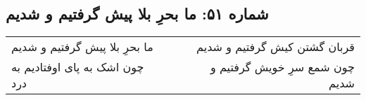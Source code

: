 \begin{center}
\section*{شماره ۵۱: ما بحرِ بلا پیش گرفتیم و شدیم}
\label{sec:051}
\begin{longtable}{l p{0.5cm} r}
ما بحرِ بلا پیش گرفتیم و شدیم
&&
قربان گشتن کیش گرفتیم و شدیم
\\
چون اشک به پای اوفتادیم به درد
&&
چون شمع سرِ خویش گرفتیم و شدیم
\\
\end{longtable}
\end{center}
